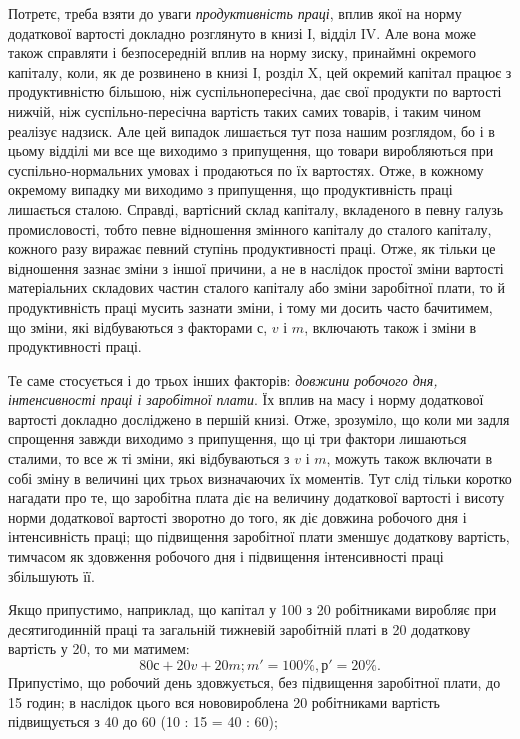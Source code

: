 
Потретє, треба взяти до уваги \emph{продуктивність праці}, вплив
якої на норму додаткової вартості докладно розглянуто в книзі І,
відділ IV. Але вона може також справляти і безпосередній
вплив на норму зиску, принаймні окремого капіталу, коли, як
де розвинено в книзі І, розділ X, цей окремий
капітал працює з продуктивністю більшою, ніж суспільнопересічна,
дає свої продукти по вартості нижчій, ніж суспільно-пересічна
вартість таких самих товарів, і таким чином
реалізує надзиск. Але цей випадок лишається тут поза нашим
розглядом, бо і в цьому відділі ми все ще виходимо з припущення,
що товари виробляються при суспільно-нормальних
умовах і продаються по їх вартостях. Отже, в кожному окремому
випадку ми виходимо з припущення, що продуктивність
праці лишається сталою. Справді, вартісний склад капіталу,
вкладеного в певну галузь промисловості, тобто певне відношення
змінного капіталу до сталого капіталу, кожного разу
виражає певний ступінь продуктивності праці. Отже, як тільки
це відношення зазнає зміни з іншої причини, а не в наслідок
простої зміни вартості матеріальних складових частин сталого
капіталу або зміни заробітної плати, то й продуктивність праці
мусить зазнати зміни, і тому ми досить часто бачитимем, що
зміни, які відбуваються з факторами $с$, $v$ і $m$, включають також
і зміни в продуктивності праці.

Те саме стосується і до трьох інших факторів: \emph{довжини робочого
дня, інтенсивності праці і заробітної плати}. Їх вплив
на масу і норму додаткової вартості докладно досліджено в першій
книзі. Отже, зрозуміло, що коли ми задля спрощення завжди
виходимо з припущення, що ці три фактори лишаються сталими,
то все ж ті зміни, які відбуваються з $v$ і $m$, можуть також включати
в собі зміну в величині цих трьох визначаючих їх моментів.
Тут слід тільки коротко нагадати про те, що заробітна плата
діє на величину додаткової вартості і висоту норми додаткової
вартості зворотно до того, як діє довжина робочого дня і інтенсивність
праці; що підвищення заробітної плати зменшує додаткову
вартість, тимчасом як здовження робочого дня і підвищення
інтенсивності праці збільшують її.

Якщо припустимо, наприклад, що капітал у 100 з 20 робітниками
виробляє при десятигодинній праці та загальній тижневій
заробітній платі в 20 додаткову вартість у 20, то ми
матимем:\[
80 с + 20 v + 20 m; m' = 100\%, р' = 20\%.
\]
Припустімо, що робочий день здовжується, без підвищення
заробітної плати, до 15 годин; в наслідок цього вся нововироблена
20 робітниками вартість підвищується з 40 до 60 (10 : 15 = 40 : 60);
\parbreak{}  %
